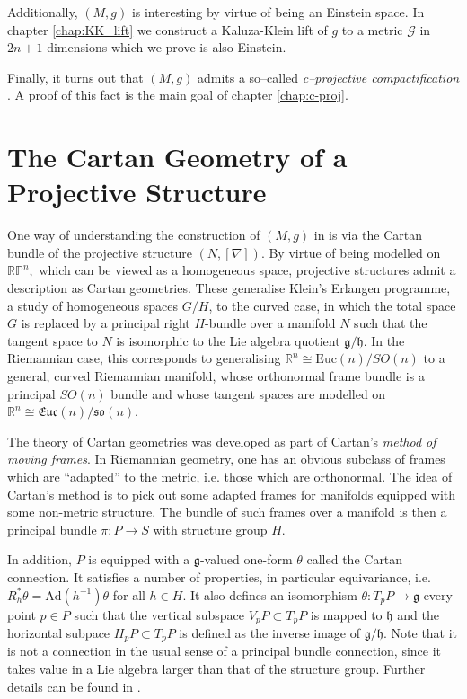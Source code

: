 Additionally, $(M,g)$ is interesting by virtue of being an Einstein
space. In chapter \ref{chap:KK_lift} we construct a Kaluza-Klein lift of $g$ to a metric $\mathcal{G}$ in $2n+1$ dimensions which we prove is also Einstein.

Finally, it turns out that $(M,g)$ admits a so--called \textit{c--projective compactification} \cite{CG}. A proof of this fact is the main goal of chapter \ref{chap:c-proj}.




\section{The Cartan Geometry of a Projective Structure}

One way of understanding the construction of $(M,g)$ in \cite{DM}
is via the Cartan bundle of the projective structure $(N,[\nabla])$.
By virtue of being modelled on $\mathbb{RP}^{n},$ which can be viewed
as a homogeneous space, projective structures admit a description
as Cartan geometries. These generalise Klein's Erlangen programme,
a study of homogeneous spaces $G/H$, to the curved case, in which
the total space $G$ is replaced by a principal right $H$-bundle
over a manifold $N$ such that the tangent space to $N$ is isomorphic
to the Lie algebra quotient $\mathfrak{g}/\mathfrak{h}$. In the Riemannian
case, this corresponds to generalising $\mathbb{R}^{n}\cong\mathrm{Euc}(n)/SO(n)$
to a general, curved Riemannian manifold, whose orthonormal frame
bundle is a principal $SO(n)$ bundle and whose tangent spaces are
modelled on $\mathbb{R}^{n}\cong\mathfrak{Euc}(n)/\mathfrak{so}(n)$.

The theory of Cartan geometries was developed as part of Cartan's
\textit{method of moving frames}. In Riemannian geometry, one has
an obvious subclass of frames which are ``adapted'' to the metric,
i.e. those which are orthonormal. The idea of Cartan's method is to
pick out some adapted frames for manifolds equipped with some non-metric
structure. The bundle of such frames over a manifold is then a principal
bundle $\pi:P\rightarrow S$ with structure group $H$.

In addition, $P$ is equipped with a $\mathfrak{g}$-valued one-form
$\theta$ called the Cartan connection. It satisfies a number of properties,
in particular equivariance, i.e. $R_{h}^{*}\theta=\mathrm{Ad}(h^{-1})\theta$
for all $h\in H$. It also defines an isomorphism $\theta:T_{p}P\rightarrow\mathfrak{g}$
every point $p\in P$ such that the vertical subspace $V_{p}P\subset T_{p}P$
is mapped to $\mathfrak{h}$ and the horizontal subpace $H_{p}P\subset T_{p}P$
is defined as the inverse image of $\mathfrak{g}/\mathfrak{h}$. Note
that it is not a connection in the usual sense of a principal bundle
connection, since it takes value in a Lie algebra larger than that
of the structure group. Further details can be found in \cite{Sharpe1997}.

